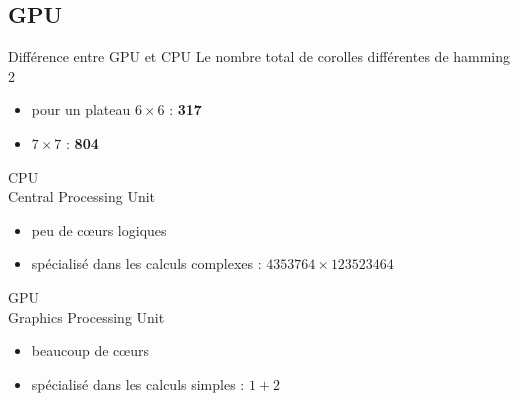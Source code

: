 	\subsection{GPU}
	\begin{frame}{Différence entre GPU et CPU}
		Le nombre total de corolles différentes de hamming 2
		\begin{itemize}
			\item pour un plateau $6\times 6$ : \textbf{317}
			\item $7\times 7$ : \textbf{804}
		\end{itemize}
		\begin{minipage}[t]{0.47\textwidth}
			\begin{Bblock}{CPU \\Central Processing Unit}
				\begin{itemize}
					\item<1-> peu de c\oe urs logiques
					\item<2-> spécialisé dans les calculs complexes : $4353764\times 123523464$
				\end{itemize}
			\end{Bblock}
		\end{minipage}\hfill
		\begin{minipage}[t]{0.47\textwidth}
			\begin{Bblock}{GPU \\Graphics Processing Unit}
				\begin{itemize}
					\item<1-> beaucoup de c\oe urs
					\item<2-> spécialisé dans les calculs simples : $1+2$
				\end{itemize}
			\end{Bblock}
		\end{minipage}\hfill
	\end{frame}

